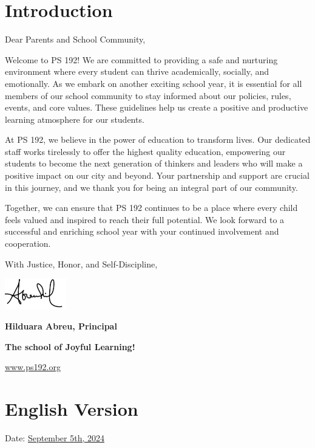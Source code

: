 \documentclass[letterpaper, 12pt]{article}
\begin{document}
\pagebreak
\vspace*{-1cm}

\section*{Introduction}
\label{sec:orgd309b85}
Dear Parents and School Community,

Welcome to PS 192! We are committed to providing a safe and nurturing environment where every student can thrive academically, socially, and emotionally. As we embark on another exciting school year, it is essential for all members of our school community to stay informed about our policies, rules, events, and core values. These guidelines help us create a positive and productive learning atmosphere for our students.

At PS 192, we believe in the power of education to transform lives. Our dedicated staff works tirelessly to offer the highest quality education, empowering our students to become the next generation of thinkers and leaders who will make a positive impact on our city and beyond. Your partnership and support are crucial in this journey, and we thank you for being an integral part of our community.

Together, we can ensure that PS 192 continues to be a place where every child feels valued and inspired to reach their full potential. We look forward to a successful and enriching school year with your continued involvement and cooperation.

With Justice, Honor, and Self-Discipline,

\includegraphics[width=0.2\textwidth]{hil_signature}

\textbf{Hilduara Abreu, Principal}

\textbf{The school of Joyful Learning!}

\href{www.ps192.org}{www.ps192.org}

\pagebreak
\vspace*{-1cm}

\section*{English Version}
\label{sec:org710a32b}
Date: \href{www.ps192.org}{September 5th, 2024}
\end{document}
